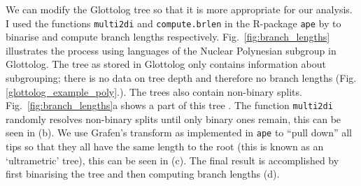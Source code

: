 \documentclass[draft,10pt]{article} %
\begin{document}
We can modify the Glottolog tree so that it is more appropriate for our analysis. I used the functions \texttt{multi2di} and \texttt{compute.brlen} in the R-package \texttt{ape} by \citet{paradis2004ape} to binarise and compute branch lengths respectively. Fig.~\ref{fig:branch_lengths} illustrates the process using languages of the Nuclear Polynesian subgroup in Glottolog. The tree as stored in Glottolog only contains information about subgrouping; there is no data on tree depth and therefore no branch lengths (Fig. \ref{glottolog_example_poly}.). The trees also contain non-binary splits. Fig.~\ref{fig:branch_lengths}a shows a part of this tree . The function \texttt{multi2di} randomly resolves non-binary splits until only binary ones remain, this can be seen in (b). We use Grafen's transform \citep{grafen1989phylogenetic} as implemented in \texttt{ape} to ``pull down'' all tips so that they all have the same length to the root (this is known as an `ultrametric' tree), this can be seen in (c). The final result is accomplished by first binarising the tree and then computing branch lengths (d). 
\end{document}
